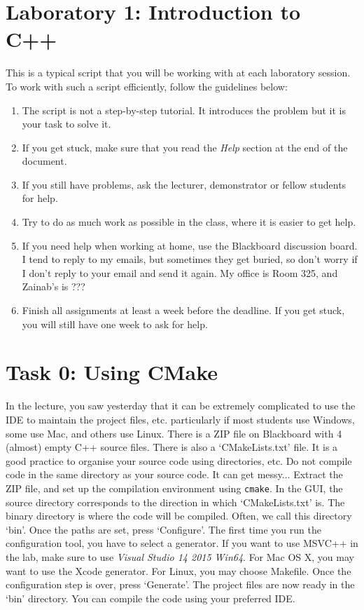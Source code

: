 
\section*{Laboratory 1: Introduction to C++}

This is a typical script that you will be working with at each
laboratory session. To work with such a script efficiently, follow the
guidelines below:
\begin{enumerate}
  \item The script is not a step-by-step tutorial. It introduces the
    problem but it is your task to solve it.

  \item If you get stuck, make sure that you read the \emph{Help} section
    at the end of the document.

  \item If you still have problems, ask the lecturer, demonstrator or
    fellow students for help.

  \item Try to do as much work as possible in the class, where it is
    easier to get help.
    
  \item If you need help when working at home, use the Blackboard
    discussion board. 
    I tend to reply to my emails, but sometimes they get buried, so don't worry if I don't reply to your email and send it again. 
    My office is Room 325, and Zainab's is ???
    
  \item Finish all assignments at least a week before the deadline. 
  If you get stuck, you will still have one week to ask for help.
\end{enumerate}

\section*{Task 0: Using CMake}

In the lecture, you saw yesterday that it can be extremely complicated to use the IDE to maintain the project files, etc. particularly if most students use Windows, some use Mac, and others use Linux. 
There is a ZIP file on Blackboard with 4 (almost) empty C++ source files. There is also a `CMakeLists.txt' file. 
It is a good practice to organise your source code using directories, etc. Do not compile code in the same directory as your source code. It can get messy... 
Extract the ZIP file, and set up the compilation environment using \verb+cmake+. 
In the GUI, the source directory corresponds to the direction in which `CMakeLists.txt' is. 
The binary directory is where the code will be compiled. Often, we call this directory `bin'. 
Once the paths are set, press `Configure'. 
The first time you run the configuration tool, you have to select a generator.
If you want to use MSVC++ in the lab, make sure to use \emph{Visual Studio 14 2015 Win64}. 
For Mac OS X, you may want to use the Xcode generator. 
For Linux, you may choose Makefile. 
Once the configuration step is over, press `Generate'. 
The project files are now ready in the `bin' directory. 
You can compile the code using your preferred IDE.


